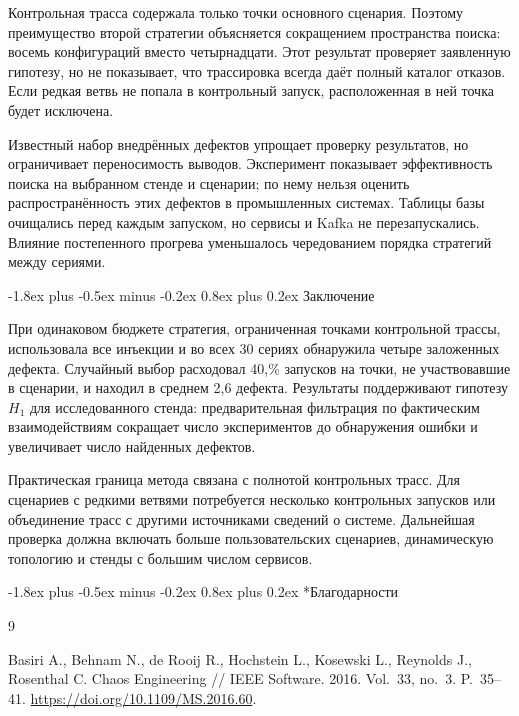 \documentclass[10pt,a4paper]{article}
\makeatletter
\renewcommand\section{\@startsection{section}{1}{\z@}%
  {-1.8ex plus -0.5ex minus -0.2ex}%
  {0.8ex plus 0.2ex}%
  {\normalfont\Large\bfseries}}
\makeatother
\begin{document}
Контрольная трасса содержала только точки основного сценария. Поэтому преимущество второй стратегии объясняется сокращением пространства поиска: восемь конфигураций вместо четырнадцати. Этот результат проверяет заявленную гипотезу, но не показывает, что трассировка всегда даёт полный каталог отказов. Если редкая ветвь не попала в контрольный запуск, расположенная в ней точка будет исключена.

Известный набор внедрённых дефектов упрощает проверку результатов, но ограничивает переносимость выводов. Эксперимент показывает эффективность поиска на выбранном стенде и сценарии; по нему нельзя оценить распространённость этих дефектов в промышленных системах. Таблицы базы очищались перед каждым запуском, но сервисы и Kafka не перезапускались. Влияние постепенного прогрева уменьшалось чередованием порядка стратегий между сериями.

\section{Заключение}

При одинаковом бюджете стратегия, ограниченная точками контрольной трассы, использовала все инъекции и во всех 30 сериях обнаружила четыре заложенных дефекта. Случайный выбор расходовал 40,\% запусков на точки, не участвовавшие в сценарии, и находил в среднем 2,6 дефекта. Результаты поддерживают гипотезу $H_1$ для исследованного стенда: предварительная фильтрация по фактическим взаимодействиям сокращает число экспериментов до обнаружения ошибки и увеличивает число найденных дефектов.

Практическая граница метода связана с полнотой контрольных трасс. Для сценариев с редкими ветвями потребуется несколько контрольных запусков или объединение трасс с другими источниками сведений о системе. Дальнейшая проверка должна включать больше пользовательских сценариев, динамическую топологию и стенды с большим числом сервисов.

\section*{Благодарности}

\begin{thebibliography}{9}

Basiri A., Behnam N., de Rooij R., Hochstein L., Kosewski L., Reynolds J., Rosenthal C.
Chaos Engineering // IEEE Software. 2016. Vol.~33, no.~3. P.~35--41.
\href{https://doi.org/10.1109/MS.2016.60}{https://doi.org/10.1109/MS.2016.60}.

\end{thebibliography}
\end{document}

